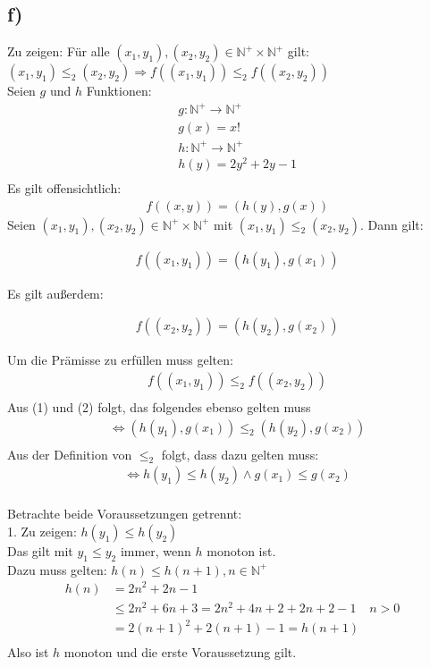 \subsection*{f)}
Zu zeigen: Für alle $(x_1, y_1), (x_2, y_2) \in \mathbb{N}^+ \times \mathbb{N}^+ $ gilt: \\
$ (x_1, y_1) \leq_2 (x_2, y_2) \Rightarrow f((x_1, y_1)) \leq_2 f((x_2, y_2))$ \\
Seien $g$ und $h$ Funktionen: \\

\begin{align*}
& g: \mathbb{N}^+ \to  \mathbb{N}^+\\
&  g(x) = x! \\
& h: \mathbb{N}^+ \to  \mathbb{N}^+\\
&  h(y) = 2y^2 +2y -1 \\
\end{align*}
Es gilt offensichtlich:
\begin{align*}
& f((x, y)) = (h(y), g(x))
\end{align*}
Seien $ (x_1, y_1), (x_2, y_2) \in \mathbb{N}^+ \times \mathbb{N}^+ $
 mit $ (x_1, y_1) \leq_2 (x_2, y_2) $.
Dann gilt:

\begin{align}
& f((x_1, y_1)) = (h(y_1), g(x_1))
\end{align}

Es gilt außerdem:

\begin{align}
& f((x_2, y_2)) = (h(y_2), g(x_2))
\end{align}

Um die Prämisse zu erfüllen muss gelten:
\begin{align*}
& f((x_1, y_1)) \leq_2 f((x_2, y_2)) \\
\end{align*}
Aus (1) und (2) folgt, das folgendes ebenso gelten muss \\
\begin{align*}
& \Leftrightarrow (h(y_1), g(x_1)) \leq_2 (h(y_2), g(x_2)) \\
\end{align*}
Aus der Definition von  $\leq_2 $ folgt, dass dazu gelten muss: \\
\begin{align*}
& \Leftrightarrow h(y_1) \leq h(y_2) \land  g(x_1) \leq g(x_2) \\
\end{align*}

Betrachte beide Voraussetzungen getrennt: \\
1. Zu zeigen: $ h(y_1) \leq h(y_2) $ \\
Das gilt mit $y_1 \leq y_2$ immer, wenn $h$ monoton ist. \\
Dazu muss gelten: $h(n) \leq h (n+1), n \in \mathbb{N}^+$ \\
\begin{align*}
 h(n) &= 2n^2+2n-1 &\\
&\leq 2n^2 +6n +3 = 2n^2 +4n +2 +2n +2 -1 & n > 0\\
& = 2(n+1)^2 + 2(n+1) -1 = h(n+1) &\\
\end{align*}
Also ist $h$ monoton und die erste Voraussetzung gilt.


